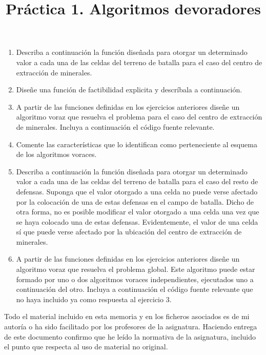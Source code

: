 \documentclass[]{article}
\title{Práctica 1. Algoritmos devoradores}
\author{}
\begin{document}


%

\begin{enumerate}
\item Describa a continuación la función diseñada para otorgar un determinado valor a cada una de las celdas del terreno de batalla para el caso del centro de extracción de minerales. 



\item Diseñe una función de factibilidad explicita y descríbala a continuación.



\item A partir de las funciones definidas en los ejercicios anteriores diseñe un algoritmo voraz que resuelva el problema para el caso del centro de extracción de minerales. Incluya a continuación el código fuente relevante. 



\item Comente las características que lo identifican como perteneciente al esquema de los algoritmos voraces. 



\item Describa a continuación la función diseñada para otorgar un determinado valor a cada una de las celdas del terreno de batalla para el caso del resto de defensas. Suponga que el valor otorgado a una celda no puede verse afectado por la colocación de una de estas defensas en el campo de batalla. Dicho de otra forma, no es posible modificar el valor otorgado a una celda una vez que se haya colocado una de estas defensas. Evidentemente, el valor de una celda sí que puede verse afectado por la ubicación del centro de extracción de minerales.



\item A partir de las funciones definidas en los ejercicios anteriores diseñe un algoritmo voraz que resuelva el problema global. Este algoritmo puede estar formado por uno o dos algoritmos voraces independientes, ejecutados uno a continuación del otro. Incluya a continuación el código fuente relevante que no haya incluido ya como respuesta al ejercicio 3. 



\end{enumerate}

Todo el material incluido en esta memoria y en los ficheros asociados es de mi autoría o ha sido facilitado por los profesores de la asignatura. Haciendo entrega de este documento confirmo que he leído la normativa de la asignatura, incluido el punto que respecta al uso de material no original.
\end{document}
